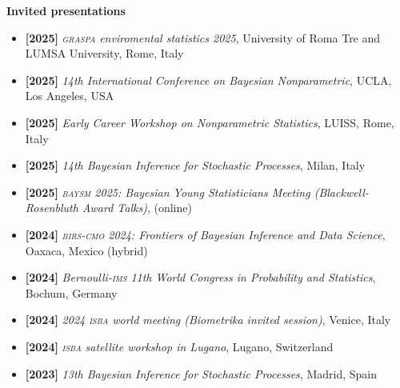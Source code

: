 \documentclass[10pt]{article}
\newenvironment{outerlist}[1][\enskip\tiny\textbullet]%
        {\begin{itemize}[#1]}{\end{itemize}%
         \vspace{-.6\baselineskip}}
\begin{document}
\textbf{Invited presentations}
\begin{outerlist}

\item[\textbf{[2025]}] \textsl{\textsc{graspa} enviromental statistics 2025}, University of Roma Tre and LUMSA University, Rome, Italy

\item[\textbf{[2025]}] \textsl{14th International Conference on Bayesian Nonparametric}, UCLA, Los Angeles, USA

\item[\textbf{[2025]}] \textsl{Early Career Workshop on Nonparametric Statistics}, LUISS, Rome, Italy

\item[\textbf{[2025]}] \textsl{14th Bayesian Inference for Stochastic Processes}, Milan, Italy

\item[\textbf{[2025]}] \textsl{\textsc{baysm} 2025: Bayesian Young Statisticians Meeting (Blackwell-Rosenbluth Award Talks)}, (online)

\item[\textbf{[2024]}] \textsl{\textsc{birs-cmo} 2024: Frontiers of Bayesian Inference and Data Science}, Oaxaca, Mexico (hybrid)

\item[\textbf{[2024]}] \textsl{Bernoulli-\textsc{ims} 11th World Congress in Probability and Statistics}, Bochum, Germany

\item[\textbf{[2024]}] \textsl{2024 \textsc{isba} world meeting (Biometrika invited session)}, Venice, Italy

\item[\textbf{[2024]}] \textsl{\textsc{isba} satellite workshop in Lugano}, Lugano, Switzerland

\item[\textbf{[2023]}] \textsl{13th Bayesian Inference for Stochastic Processes}, Madrid, Spain


\end{outerlist}
\end{document}
